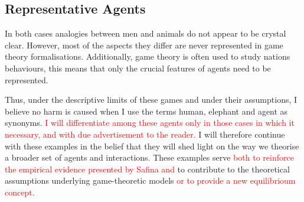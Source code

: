 \subsection*{Representative Agents}

\vspace{1em}
In both cases analogies between men and animals do not appear to be crystal clear. However, most of the aspects they differ are never represented in game theory formalisations. Additionally, game theory is often used to study nations behaviours, this means that only the crucial features of agents need to be represented.

Thus, under the descriptive limits of these games and under their assumptions, I believe no harm is caused when I use the terms human, elephant and agent as synonyms. \textcolor{red}{I will differentiate among these agents only in those cases in which it necessary, and with due advertisement to the reader.}
I will therefore continue with these examples in the belief that they will shed light on the way we theorise a broader set of agents and interactions. These examples serve \textcolor{red}{both to reinforce the empirical evidence presented by Safina and} to contribute to the theoretical assumptions underlying game-theoretic models \textcolor{red}{or to provide a new equilibrioum concept.}
